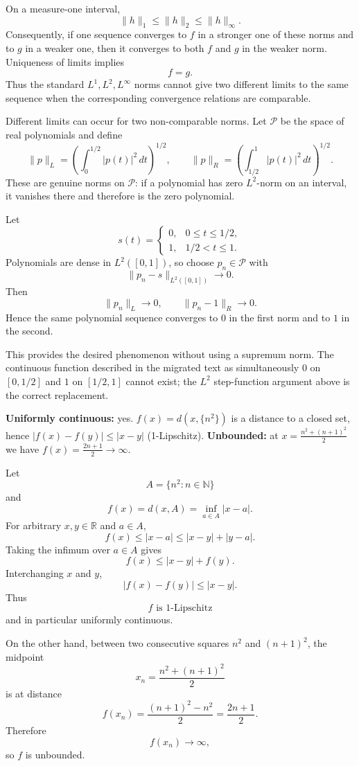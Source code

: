 \begin{solution}
On a measure-one interval,
\[
\|h\|_1\le \|h\|_2\le\|h\|_\infty.
\]
Consequently, if one sequence converges to \(f\) in a stronger one of these norms and to \(g\) in a weaker one, then it converges to both \(f\) and \(g\) in the weaker norm. Uniqueness of limits implies
\[
f=g.
\]
Thus the standard \(L^1,L^2,L^\infty\) norms cannot give two different limits to the same sequence when the corresponding convergence relations are comparable.

Different limits can occur for two non-comparable norms. Let \(\mathcal P\) be the space of real polynomials and define
\[
\|p\|_{L}
=
\left(\int_0^{1/2}|p(t)|^2\,dt\right)^{1/2},
\qquad
\|p\|_{R}
=
\left(\int_{1/2}^{1}|p(t)|^2\,dt\right)^{1/2}.
\]
These are genuine norms on \(\mathcal P\): if a polynomial has zero \(L^2\)-norm on an interval, it vanishes there and therefore is the zero polynomial.

Let
\[
s(t)=
\begin{cases}
0,&0\le t\le1/2,\\
1,&1/2<t\le1.
\end{cases}
\]
Polynomials are dense in \(L^2([0,1])\), so choose \(p_n\in\mathcal P\) with
\[
\|p_n-s\|_{L^2([0,1])}\longrightarrow0.
\]
Then
\[
\|p_n\|_{L}\longrightarrow0,
\qquad
\|p_n-1\|_{R}\longrightarrow0.
\]
Hence the same polynomial sequence converges to \(0\) in the first norm and to \(1\) in the second.

This provides the desired phenomenon without using a supremum norm. The continuous function described in the migrated text as simultaneously \(0\) on \([0,1/2]\) and \(1\) on \([1/2,1]\) cannot exist; the \(L^2\) step-function argument above is the correct replacement.
\end{solution}


\begin{problem}[CP-II-0021]
\label{prob:cp-ii-0021}
\textbf{Uniformly continuous:} yes. $f(x)=d(x,\{n^2\})$ is a distance to a closed set,
	hence $|f(x)-f(y)|\le|x-y|$ (1-Lipschitz).
	\textbf{Unbounded:} at $x=\tfrac{n^2+(n+1)^2}{2}$ we have $f(x)=\tfrac{2n+1}{2}\to\infty$.
\end{problem}

\begin{solution}
Let
\[
A=\{n^2:n\in\mathbb N\}
\]
and
\[
f(x)=d(x,A)=\inf_{a\in A}|x-a|.
\]
For arbitrary \(x,y\in\mathbb R\) and \(a\in A\),
\[
f(x)\le |x-a|
\le |x-y|+|y-a|.
\]
Taking the infimum over \(a\in A\) gives
\[
f(x)\le |x-y|+f(y).
\]
Interchanging \(x\) and \(y\),
\[
|f(x)-f(y)|\le|x-y|.
\]
Thus
\[
\boxed{f\text{ is }1\text{-Lipschitz}}
\]
and in particular uniformly continuous.

On the other hand, between two consecutive squares \(n^2\) and \((n+1)^2\), the midpoint
\[
x_n=\frac{n^2+(n+1)^2}{2}
\]
is at distance
\[
f(x_n)
=
\frac{(n+1)^2-n^2}{2}
=
\frac{2n+1}{2}.
\]
Therefore
\[
f(x_n)\longrightarrow\infty,
\]
so \(f\) is unbounded.
\end{solution}


